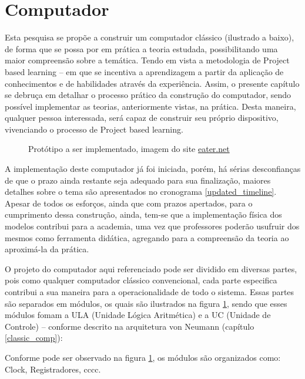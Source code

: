 \section{Computador} 
\label{computer}
Esta pesquisa se propõe a construir um computador clássico (ilustrado a baixo), de forma que se possa por em prática a teoria estudada, possibilitando uma maior compreensão sobre a temática. Tendo em vista a metodologia de Project based learning – em que se incentiva a aprendizagem a partir da aplicação de conhecimentos e de habilidades através da experiência. Assim, o presente capítulo se debruça em detalhar o processo prático da construção do computador, sendo possível implementar as teorias, anteriormente vistas, na prática. Desta maneira, qualquer pessoa interessada, será capaz de construir seu próprio dispositivo, vivenciando o processo de Project based learning. 

\vspace{1cm}
\begin{figure}[H] \centering 
  \caption{\label{breadboard_computer} Protótipo a ser implementado, imagem do site \href{https://eater.net/}{eater.net}} 
\end{figure}

A implementação deste computador já foi iniciada, porém, há sérias desconfianças de que o prazo ainda restante seja adequado para sua finalização, maiores detalhes sobre o tema são apresentados no cronograma \ref{updated_timeline}. Apesar de todos os esforços, ainda que com prazos apertados, para o cumprimento dessa construção, ainda, tem-se que a implementação física dos modelos contribui para a academia, uma vez que professores poderão usufruir dos mesmos como ferramenta didática, agregando para a compreensão da teoria ao aproximá-la da prática.

O projeto do computador aqui referenciado pode ser dividido em diversas partes, pois como qualquer computador clássico convencional, cada parte especifica contribui a sua maneira para a operacionalidade de todo o sistema. Essas partes são separados em módulos, os quais são ilustrados na figura \ref{breadboard_computer}, sendo que esses módulos fomam a ULA (Unidade Lógica Aritmética) e a UC (Unidade de Controle) – conforme descrito na arquitetura von Neumann (capítulo \ref{classic_comp}):

Conforme pode ser observado na figura \ref{breadboard_computer}, os módulos são organizados como: Clock, Registradores, cccc.

